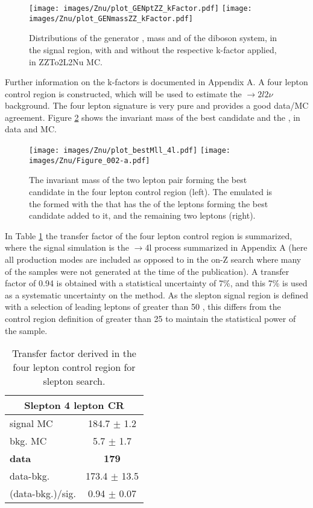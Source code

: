 \begin{figure}[htbp!]
\begin{center}
\texttt{[image: images/Znu/plot\_GENptZZ\_kFactor.pdf]}
\texttt{[image: images/Znu/plot\_GENmassZZ\_kFactor.pdf]}
\caption{Distributions of the generator \pt, mass and \dphi of the diboson system, in the signal region, with and without the respective k-factor applied, in ZZTo2L2Nu MC.}
\label{kfactor}
\end{center}
\end{figure}
Further information on the k-factors is documented in Appendix A.
A four lepton control region is constructed, which will be used to estimate the \PZZ$\rightarrow 2l2\nu$ background. The four lepton signature is very pure and provides a good data/MC agreement.
Figure \ref{fig:ZZslepton} shows the invariant mass of the best \PZ candidate and the \mttwo, in data and MC.
\begin{figure}[htbp!]
\begin{center}
\texttt{[image: images/Znu/plot\_bestMll\_4l.pdf]}
\texttt{[image: images/Znu/Figure\_002-a.pdf]}
\caption{The invariant mass of the two lepton pair forming the best \PZ candidate in the four lepton control region (left). The emulated \mttwo is the \mttwo formed with the \ptmiss that has the \pt of the leptons forming the best \PZ candidate added to it, and the remaining two leptons (right).}
\label{fig:ZZslepton}
\end{center}
\end{figure}
In Table \ref{tab:tab4lcontrol} the transfer factor of the four lepton control region is summarized, where the signal simulation is the \PZZ$\rightarrow$4l process summarized in Appendix A (here all production modes are included as opposed to in the on-Z search where many of the samples were not generated at the time of the publication).
A transfer factor of 0.94 is obtained with a statistical uncertainty of 7\%, and this 7\% is used as a systematic uncertainty on the method. 
As the slepton signal region is defined with a selection of leading leptons of \pt greater than 50 \GeV, this differs from the control region definition of \pt greater than 25 \GeV to maintain the statistical power of the sample. 
\begin{table}[ht!]
\def\arraystretch{1.2}
\setlength{\belowcaptionskip}{6pt}
\small                
\centering                        
\caption{Transfer factor derived in the four lepton control region for slepton search.}
\label{tab:tab4lcontrol}          
\begin{tabular}{l c }
\hline \hline
\multicolumn{2}{c}{Slepton 4 lepton CR}  \\\hline
signal MC        & 184.7     $\pm$  1.2    \\
bkg. MC          & 5.7  $\pm$  1.7\\ \hline
\textbf{data}       & \textbf{179}  \\
data-bkg.        &  173.4   $\pm$  13.5 \\ \hline
(data-bkg.)/sig. & 0.94   $\pm$  0.07\\\hline\hline
\end{tabular}    
\end{table}
